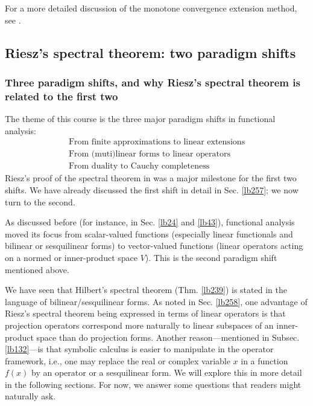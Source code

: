 \documentclass[12pt,b5paper,notitlepage]{article}
\theoremstyle{definition}
\theoremstyle{plain}
\numberwithin{equation}{section}
\begin{document}
For a more detailed discussion of the monotone convergence extension method, see \cite[Ch. 25]{Gui-A}.






\subsection{Riesz's spectral theorem: two paradigm shifts}\label{lb245}

\subsubsection{Three paradigm shifts, and why Riesz's spectral theorem is related to the first two}


The theme of this course is the three major paradigm shifts in functional analysis:
\begin{subequations}\label{eq147}
\begin{gather}
\text{From finite approximations to linear extensions}\label{eq147a}\\
\text{From (muti)linear forms to linear operators}\label{eq147b}\\
\text{From duality to Cauchy completeness}\label{eq147c}
\end{gather}
\end{subequations}
Riesz's proof of the spectral theorem in \cite{Rie13} was a major milestone for the first two shifts. We have already discussed the first shift in detail in Sec. \ref{lb257}; we now turn to the second.


As discussed before (for instance, in Sec. \ref{lb24} and \ref{lb43}), functional analysis moved its focus from scalar-valued functions (especially linear functionals and bilinear or sesquilinear forms) to vector-valued functions (linear operators acting on a normed or inner-product space $V$). This is the second paradigm shift mentioned above.



We have seen that Hilbert's spectral theorem (Thm. \ref{lb239}) is stated in the language of bilinear/sesquilinear forms. As noted in Sec. \ref{lb258}, one advantage of Riesz's spectral theorem being expressed in terms of linear operators is that projection operators correspond more naturally to linear subspaces of an inner-product space than do projection forms. Another reason---mentioned in Subsec. \ref{lb132}---is that symbolic calculus is easier to manipulate in the operator framework, i.e., one may replace the real or complex variable $x$ in a function $f(x)$ by an operator or a sesquilinear form. We will explore this in more detail in the following sections. For now, we answer some questions that readers might naturally ask.
\end{document}

